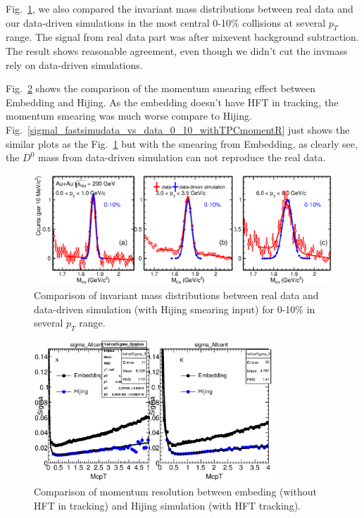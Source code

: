 Fig.~\ref{sigmal_fastsimudata_vs_data_0_10}, we also compared the invariant mass distributions between real data and our data-driven simulations in the most central 0-10\% collisions at several $p_T$ range. The signal from real data part was after mixevent background subtraction. The result shows reasonable agreement, even though we didn't cut the invmass rely on data-driven simulations.

Fig.~\ref{momentum_resolution_compare_input} shows the comparison of the momentum smearing effect between Embedding and Hijing. As the embedding doesn't have HFT in tracking, the momentum smearing was much worse compare to Hijing. Fig.~\ref{sigmal_fastsimudata_vs_data_0_10_withTPCmomentR} just shows the similar plots as the Fig.~\ref{sigmal_fastsimudata_vs_data_0_10} but with the smearing from Embedding, as clearly see, the $D^0$ mass from data-driven simulation can not reproduce the real data.

\begin{figure}[htbp]
\centering
\includegraphics[keepaspectratio,width=1.0\textwidth,angle=0]{figure/Run14_D0HFT/sigmal_fastsimudata_vs_data_0_10.eps}
\caption{Comparison of invariant mass distributions between real data and data-driven simulation (with Hijing smearing input) for 0-10\% in several $p_{T}$ range.}
\label{sigmal_fastsimudata_vs_data_0_10}
\end{figure}

\begin{figure}[htbp]
\centering
\includegraphics[keepaspectratio,width=0.8\textwidth,angle=0]{figure/Run14_D0HFT/momentum_resolution_compare_input.eps}
\caption{Comparison of momentum resolution between embeding (without HFT in tracking) and Hijing simulation (with HFT tracking).}
\label{momentum_resolution_compare_input}
\end{figure}

